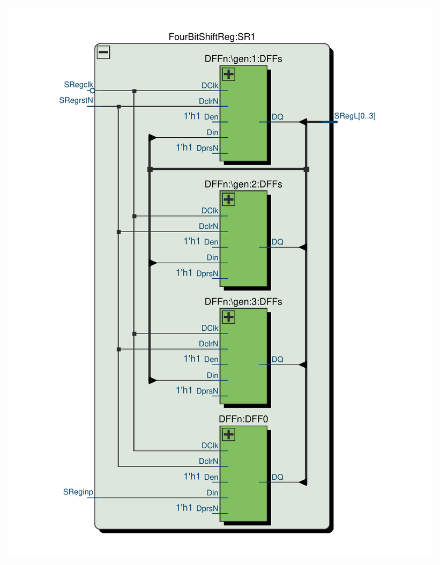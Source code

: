 \documentclass[13pt,a4paper]{report}
\begin{document}
\begin{figure}[H]
{\includegraphics[scale=0.35, clip, trim={3cm 1cm 3cm 1.8cm}]{images/Exc3_FourBitShiftReg_RTL.pdf}
}
\end{figure}
\end{document}
